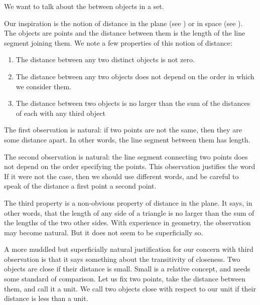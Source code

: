 

We want to talk about the  between objects in a set.


Our inspiration is the notion of distance in the plane (see ) or in space (see ).
The objects are points and the distance between them is the length of the line segment joining them.
We note a few properties of this notion of distance:

\begin{enumerate}
  \item
    The distance between any two
    distinct objects is not zero.

  \item
    The distance between any
    two objects does not depend
    on the order in which we
    consider them.

  \item
    The distance between
    two objects is no larger
    than the sum of the distances
    of each with any third object
\end{enumerate}

The first observation
is natural: if two points are not
the same, then they are some
distance apart.
In other words, the line
segment between
them has length.

The second observation is natural:
the line segment connecting
two points does not depend on the
order specifying the points.
This observation
justifies the word
If it were not the case,
then we should use different words,
and be careful to speak
of the distance  a
first point  a second
point.

The third property is
a non-obvious property of
distance in the plane.
It says, in other words,
that the length of any side
of a triangle is no larger than
the sum of the lengths of the
two other sides.
With experience in geometry,
the observation may become
natural. But it does
not seem to be superficially so.

A more muddled but superficially
natural justification for our
concern with third observation
is that it says something
about the transitivity of
closeness.
Two objects are close if
their distance is small.
Small is a relative concept,
and needs some standard of
comparison.
Let us fix two points, take
the distance between them,
and call it a unit.
We call two objects close
with respect to our unit
if their distance is less than a unit.

